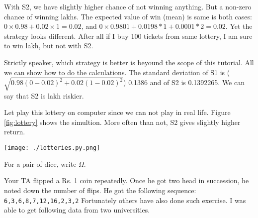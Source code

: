 \documentclass[a4paper,8pt,addpoints,solution]{exam}
\begin{document}
\begin{questions}
\begin{solution}
    With S2, we have slightly higher chance of not winning anything. But a non-zero
    chance of winning  lakhs. The expected value of win (mean) is same is
    both cases: $0 \times 0.98 + 0.02 \times 1 = 0.02$, and $0\times 0.9801 + 0.0198
    * 1 + 0.0001 * 2 = 0.02$. Yet the strategy looks different. After all if I buy
    100 tickets from same lottery, I am sure to win  lakh, but not with S2.

    Strictly speaker, which strategy is better is beyound the scope of this
    tutorial. All we can show how to do the calculations.  The standard deviation of
    S1 is ($\sqrt{0.98(0-0.02)^2+0.02(1-0.02)^2}$) 0.1386 and of S2 is
    0.1392265. We can say that S2 is  lakh riskier.

    Let play this lottery on computer since we can not play in real life.
    Figure \ref{fig:lottery} shows the simultion. More often than not, S2 gives
    slightly higher return.

    \texttt{[image: ./lotteries.py.png]}\label{fig:lottery}

\end{solution}

\question For a pair of dice, write $\Omega$.

\question
Your TA flipped a Rs. 1 coin repeatedly. Once he got two head in succession,
he noted down the number of flips. He got the following sequence:
\verb|6,3,6,8,7,12,16,2,3,2| 
Fortunately others have also done such exercise. I was able to get following
data from two universities.


\end{questions}
\end{document}
